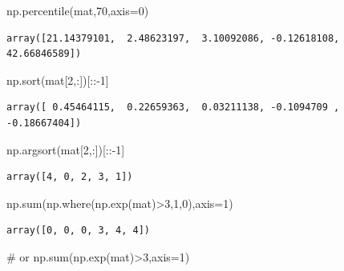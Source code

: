 \documentclass[
  a4paper,
  DIV=11,
  numbers=noendperiod]{scrreprt}
\newenvironment{Shaded}{\begin{snugshade}}{\end{snugshade}}
\newcommand{\BuiltInTok}[1]{\textcolor[rgb]{0.00,0.23,0.31}{#1}}
\newcommand{\CommentTok}[1]{\textcolor[rgb]{0.37,0.37,0.37}{#1}}
\newcommand{\DecValTok}[1]{\textcolor[rgb]{0.68,0.00,0.00}{#1}}
\newcommand{\NormalTok}[1]{\textcolor[rgb]{0.00,0.23,0.31}{#1}}
\newcommand{\OperatorTok}[1]{\textcolor[rgb]{0.37,0.37,0.37}{#1}}
\begin{document}
\begin{Shaded}
\begin{Highlighting}[]
\NormalTok{np.percentile(mat,}\DecValTok{70}\NormalTok{,axis}\OperatorTok{=}\DecValTok{0}\NormalTok{)}
\end{Highlighting}
\end{Shaded}

\begin{verbatim}
array([21.14379101,  2.48623197,  3.10092086, -0.12618108, 42.66846589])
\end{verbatim}

\begin{Shaded}
\begin{Highlighting}[]
\NormalTok{np.sort(mat[}\DecValTok{2}\NormalTok{,:])[::}\OperatorTok{{-}}\DecValTok{1}\NormalTok{]}
\end{Highlighting}
\end{Shaded}

\begin{verbatim}
array([ 0.45464115,  0.22659363,  0.03211138, -0.1094709 , -0.18667404])
\end{verbatim}

\begin{Shaded}
\begin{Highlighting}[]
\NormalTok{np.argsort(mat[}\DecValTok{2}\NormalTok{,:])[::}\OperatorTok{{-}}\DecValTok{1}\NormalTok{]}
\end{Highlighting}
\end{Shaded}

\begin{verbatim}
array([4, 0, 2, 3, 1])
\end{verbatim}

\begin{Shaded}
\begin{Highlighting}[]
\NormalTok{np.}\BuiltInTok{sum}\NormalTok{(np.where(np.exp(mat)}\OperatorTok{\textgreater{}}\DecValTok{3}\NormalTok{,}\DecValTok{1}\NormalTok{,}\DecValTok{0}\NormalTok{),axis}\OperatorTok{=}\DecValTok{1}\NormalTok{)}
\end{Highlighting}
\end{Shaded}

\begin{verbatim}
array([0, 0, 0, 3, 4, 4])
\end{verbatim}

\begin{Shaded}
\begin{Highlighting}[]
\CommentTok{\# or}
\NormalTok{np.}\BuiltInTok{sum}\NormalTok{(np.exp(mat)}\OperatorTok{\textgreater{}}\DecValTok{3}\NormalTok{,axis}\OperatorTok{=}\DecValTok{1}\NormalTok{)}
\end{Highlighting}
\end{Shaded}
\end{document}
